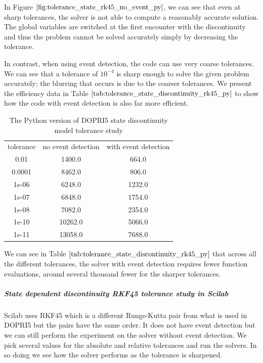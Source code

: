 In Figure $\ref{fig:tolerance_state_rk45_no_event_py}$, we can see that even at sharp tolerances, the solver is not able to compute a reasonably accurate solution. The global variables are switched at the first encounter with the discontinuity and thus the problem cannot be solved accurately simply by decreasing the tolerance.

In contrast, when using event detection, the code can use very coarse tolerances. We can see that a tolerance of $10^{-4}$ is sharp enough to solve the given problem accurately; the blurring that occurs is due to the coarser tolerances. We present the efficiency data in Table $\ref{tab:tolerance_state_discontinuity_rk45_py}$ to show how the code with event detection is also far more efficient.

\begin{table}[h]
\caption {The Python version of DOPRI5 state discontinuity model tolerance study} \label{tab:tolerance_state_discontinuity_rk45_py} 
\begin{center}
\begin{tabular}{ c c c }
tolerance & no event detection & with event detection \\
0.01 & 1400.0 & 664.0 \\
0.0001 & 8462.0 & 806.0 \\
1e-06 & 6248.0 & 1232.0 \\
1e-07 & 6848.0 & 1754.0 \\
1e-08 & 7082.0 & 2354.0 \\
1e-10 & 10262.0 & 5066.0 \\
1e-11 & 13058.0 & 7688.0 \\
\end{tabular}
\end{center}
\end{table}

We can see in Table $\ref{tab:tolerance_state_discontinuity_rk45_py}$ that across all the different tolerances, the solver with event detection requires fewer function evaluations, around several thousand fewer for the sharper tolerances. 

\subparagraph{State dependent discontinuity RKF45 tolerance study in Scilab}
Scilab uses RKF45 which is a different Runge-Kutta pair from what is used in DOPRI5 but the pairs have the same order. It does not have event detection but we can still perform the experiment on the solver without event detection. We pick several values for the absolute and relative tolerances and run the solvers. In so doing we see how the solver performs as the tolerance is sharpened. 

